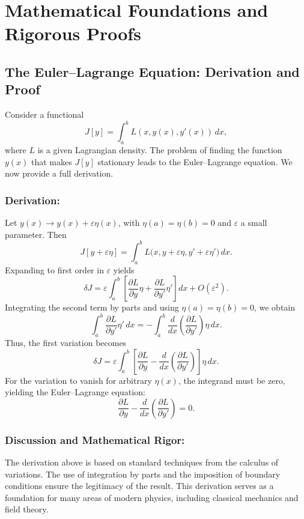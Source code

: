 \documentclass[11pt,a4paper]{article}
\begin{document}
\section{Mathematical Foundations and Rigorous Proofs}

\subsection{The Euler--Lagrange Equation: Derivation and Proof}

Consider a functional
\[
J[y] = \int_{a}^{b} L(x, y(x), y'(x))\, dx,
\]
where \(L\) is a given Lagrangian density. The problem of finding the function \(y(x)\) that makes \(J[y]\) stationary leads to the Euler--Lagrange equation. We now provide a full derivation.

\subsubsection*{Derivation:}
Let \(y(x) \rightarrow y(x) + \varepsilon \eta(x)\), with \(\eta(a)=\eta(b)=0\) and \(\varepsilon\) a small parameter. Then
\[
J[y+\varepsilon \eta] = \int_{a}^{b} L\bigl(x, y+\varepsilon\eta, y'+\varepsilon\eta'\bigr)\, dx.
\]
Expanding to first order in \(\varepsilon\) yields
\[
\delta J = \varepsilon \int_{a}^{b} \left[ \frac{\partial L}{\partial y}\eta + \frac{\partial L}{\partial y'}\eta' \right] dx + O(\varepsilon^2).
\]
Integrating the second term by parts and using \(\eta(a)=\eta(b)=0\), we obtain
\[
\int_{a}^{b} \frac{\partial L}{\partial y'}\eta'\, dx = - \int_{a}^{b} \frac{d}{dx} \left( \frac{\partial L}{\partial y'} \right) \eta\, dx.
\]
Thus, the first variation becomes
\[
\delta J = \varepsilon \int_{a}^{b} \left[ \frac{\partial L}{\partial y} - \frac{d}{dx}\left( \frac{\partial L}{\partial y'} \right) \right] \eta\, dx.
\]
For the variation to vanish for arbitrary \(\eta(x)\), the integrand must be zero, yielding the Euler--Lagrange equation:
\[
\frac{\partial L}{\partial y} - \frac{d}{dx}\left( \frac{\partial L}{\partial y'} \right) = 0.
\]

\subsubsection*{Discussion and Mathematical Rigor:}
The derivation above is based on standard techniques from the calculus of variations. The use of integration by parts and the imposition of boundary conditions ensure the legitimacy of the result. This derivation serves as a foundation for many areas of modern physics, including classical mechanics and field theory.
\end{document}
